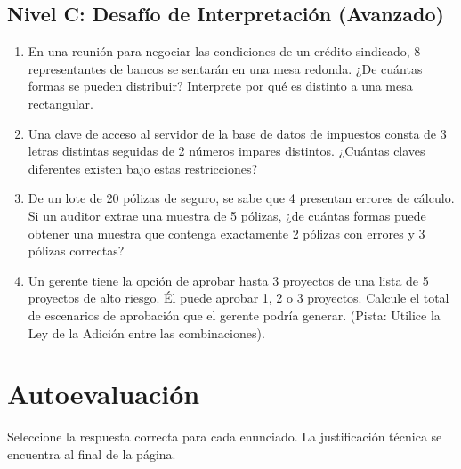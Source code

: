 \documentclass[12pt,letterpaper]{book}
\begin{document}
\subsection*{Nivel C: Desafío de Interpretación (Avanzado)}
\begin{enumerate}[label=\textbf{\arabic*.}, start=9]
    \item En una reunión para negociar las condiciones de un crédito sindicado, 8 representantes de bancos se sentarán en una mesa redonda. ¿De cuántas formas se pueden distribuir? Interprete por qué es distinto a una mesa rectangular.
    \item Una clave de acceso al servidor de la base de datos de impuestos consta de 3 letras distintas seguidas de 2 números impares distintos. ¿Cuántas claves diferentes existen bajo estas restricciones?
    \item De un lote de 20 pólizas de seguro, se sabe que 4 presentan errores de cálculo. Si un auditor extrae una muestra de 5 pólizas, ¿de cuántas formas puede obtener una muestra que contenga exactamente 2 pólizas con errores y 3 pólizas correctas?
    \item Un gerente tiene la opción de aprobar hasta 3 proyectos de una lista de 5 proyectos de alto riesgo. Él puede aprobar 1, 2 o 3 proyectos. Calcule el total de escenarios de aprobación que el gerente podría generar. (Pista: Utilice la Ley de la Adición entre las combinaciones).
\end{enumerate}

\section{Autoevaluación}

Seleccione la respuesta correcta para cada enunciado. La justificación técnica se encuentra al final de la página.
\end{document}

